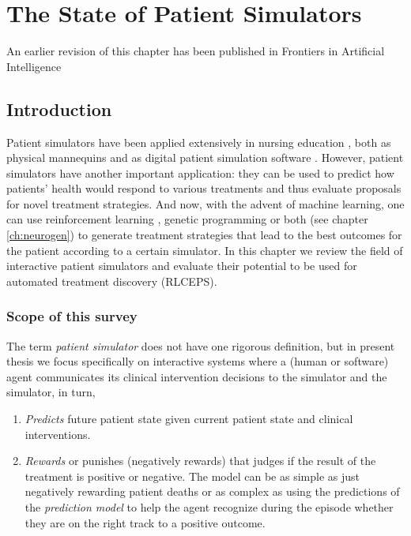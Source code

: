 \chapter{The State of Patient Simulators}
\label{ch:simulators-sota}

\begin{remark}
    An earlier revision of this chapter \cite[section 2]{liventsevEffectivePatientSimulators2021} has been published in Frontiers in Artificial Intelligence
\end{remark}


\section{Introduction}
\label{sec:intro}

Patient simulators have been applied extensively in nursing education \cite{mcfetrichStructuredLiteratureReview2006,nehringHumanPatientSimulators2001,nehringCurrentUseOpinions2004}, both as physical mannequins and as digital patient simulation software \cite{leeEffectiveVirtualPatient2020}.
However, patient simulators have another important application: they can be used to predict how patients' health would respond to various treatments and thus evaluate proposals for novel treatment strategies.
And now, with the advent of machine learning, one can use reinforcement learning \cite{yuReinforcementLearningHealthcare2021}, genetic programming or both (see chapter \ref{ch:neurogen}) to generate treatment strategies that lead to the best outcomes for the patient according to a certain simulator.
In this chapter we review the field of interactive patient simulators and evaluate their potential to be used for automated treatment discovery (RLCEPS).

\subsection{Scope of this survey}
\label{sec:scope}

The term \emph{patient simulator} does not have one rigorous definition, but in present thesis we focus specifically on interactive systems where a (human or software) agent communicates its clinical intervention decisions to the simulator and the simulator, in turn,
\begin{enumerate}
    \item \emph{Predicts} future patient state given current patient state and clinical interventions.
    \item \emph{Rewards} or punishes (negatively rewards) that judges if the result of the treatment is positive or negative. The model can be as simple as just negatively rewarding patient deaths or as complex as using the predictions of the \emph{prediction model} to help the agent recognize during the episode whether they are on the right track to a positive outcome.
\end{enumerate}


